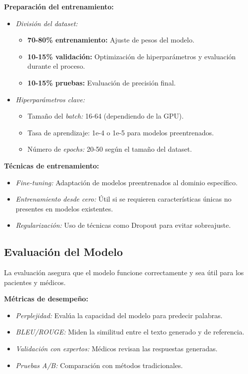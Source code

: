 \textbf{Preparación del entrenamiento:}
\begin{itemize}
    \item \textit{División del dataset:}
    \begin{itemize}
        \item \textbf{70-80\% entrenamiento:} Ajuste de pesos del modelo.
        \item \textbf{10-15\% validación:} Optimización de hiperparámetros y evaluación durante el proceso.
        \item \textbf{10-15\% pruebas:} Evaluación de precisión final.
    \end{itemize}
    \item \textit{Hiperparámetros clave:}
    \begin{itemize}
        \item Tamaño del \textit{batch:} 16-64 (dependiendo de la GPU).
        \item Tasa de aprendizaje: 1e-4 o 1e-5 para modelos preentrenados.
        \item Número de \textit{epochs:} 20-50 según el tamaño del dataset.
    \end{itemize}
\end{itemize}

\textbf{Técnicas de entrenamiento:}
\begin{itemize}
    \item \textit{Fine-tuning:} Adaptación de modelos preentrenados al dominio específico.
    \item \textit{Entrenamiento desde cero:} Útil si se requieren características únicas no presentes en modelos existentes.
    \item \textit{Regularización:} Uso de técnicas como Dropout para evitar sobreajuste.
\end{itemize}

\subsection{Evaluación del Modelo}
La evaluación asegura que el modelo funcione correctamente y sea útil para los pacientes y médicos.

\textbf{Métricas de desempeño:}
\begin{itemize}
    \item \textit{Perplejidad:} Evalúa la capacidad del modelo para predecir palabras.
    \item \textit{BLEU/ROUGE:} Miden la similitud entre el texto generado y de referencia.
    \item \textit{Validación con expertos:} Médicos revisan las respuestas generadas.
    \item \textit{Pruebas A/B:} Comparación con métodos tradicionales.
\end{itemize}

